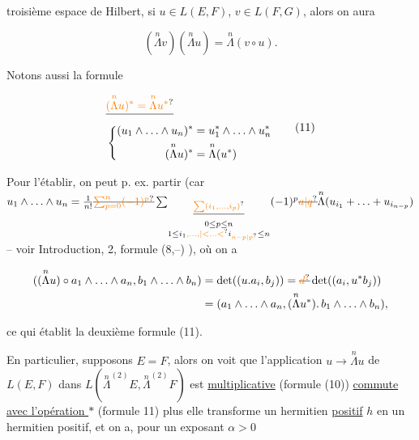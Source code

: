 troisième espace de Hilbert, si $u\in L(E,F)$, $v\in L(F,G)$, alors on aura

\[
(\overset{n}{\Lambda}v)(\overset{n}{\Lambda}u)=\overset{n}{\Lambda}(v\circ u).\tag*{(10)}
\]

Notons aussi la formule

\[
\begin{aligned}
&\deleted{\unsure{(\overset{n}{\Lambda}u)^*=\overset{n}{\Lambda}u^*}}\\
&\left\{\begin{aligned}
(u_1\wedge\ldots\wedge u_n)^*&=u_1^*\wedge\ldots\wedge u_n^*\\
(\overset{n}{\Lambda}u)^*&=\overset{n}{\Lambda}(u^*)
\end{aligned}\right.
\end{aligned}\tag*{(11)}
\]


Pour l'établir, on peut p. ex.   partir  (car $u_1\wedge\ldots\wedge u_n=\frac1{n!}\deleted{\unsure{\sum_{p=0}^{n}(-1)^p}}\sum_{\substack{\deleted{\unsure{\sum(i_1,\ldots,i_p)}}\\0\leq p\leq n\\1\leq i_1\unsure{,\ldots,|<\ldots<}i_{\unsure{n-p|p}}\leq n}}(-1)^p\deleted{\unsure{a|q}}\overset{n}{\Lambda}(u_{i_1}+\ldots+u_{i_{n-p}})$ -- voir Introduction, 2, formule (8,--) ), où on a

\[
\begin{aligned}
((\overset{n}{\Lambda}u)\circ a_1\wedge\ldots\wedge a_n,b_1\wedge\ldots\wedge b_n)&=\det((u.a_i,b_j))=\deleted{\unsure{d}}\det((a_i,u^*b_j))\\
&=(a_1\wedge\ldots\wedge a_n,(\overset{n}{\Lambda}u^*).\,b_1\wedge\ldots\wedge b_n),
\end{aligned}
\]

ce qui établit  la deuxième formule (11).

En particulier, supposons $E=F$, alors on voit que l'application $u\longrightarrow\overset{n}{\Lambda}u$ de $L(E,F)$ dans $L(\overset{n}{\Lambda}^{(2)}E,\overset{n}{\Lambda}^{(2)}F)$ est \uline{multiplicative} (formule (10)) \uline{commute avec l'opération $*$} (formule 11)   plus elle transforme  un hermitien \uline{positif} $h$ en un hermitien positif, et on a, pour  un exposant  $\alpha>0$

